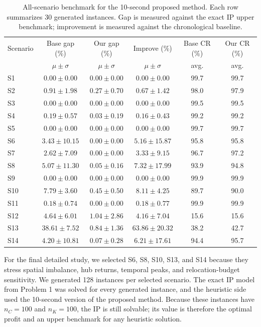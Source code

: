\documentclass[10pt,a4paper]{article}
\begin{document}
\begin{table}[ht]
\centering
\small
\setlength{\tabcolsep}{3pt}
\begin{tabular}{lccc|cc}
\toprule
Scenario & Base gap (\%) & Our gap (\%) & Improve (\%) & Base CR (\%) & Our CR (\%)\\
& $\mu \pm \sigma$ & $\mu \pm \sigma$ & $\mu \pm \sigma$ & avg. & avg.\\
\midrule
S1  & $0.00 \pm 0.00$ & $0.00 \pm 0.00$ & $0.00 \pm 0.00$ & 99.7 & 99.7\\
S2  & $0.91 \pm 1.98$ & $0.27 \pm 0.70$ & $0.67 \pm 1.42$ & 98.0 & 97.9\\
S3  & $0.00 \pm 0.00$ & $0.00 \pm 0.00$ & $0.00 \pm 0.00$ & 99.5 & 99.5\\
S4  & $0.19 \pm 0.57$ & $0.03 \pm 0.19$ & $0.16 \pm 0.43$ & 99.2 & 99.2\\
S5  & $0.00 \pm 0.00$ & $0.00 \pm 0.00$ & $0.00 \pm 0.00$ & 99.7 & 99.7\\
S6  & $3.43 \pm 10.15$ & $0.00 \pm 0.00$ & $5.16 \pm 15.87$ & 95.8 & 95.8\\
S7  & $2.62 \pm 7.09$ & $0.00 \pm 0.00$ & $3.33 \pm 9.15$ & 96.7 & 97.2\\
S8  & $5.07 \pm 11.30$ & $0.05 \pm 0.16$ & $7.32 \pm 17.99$ & 93.9 & 94.8\\
S9  & $0.00 \pm 0.00$ & $0.00 \pm 0.00$ & $0.00 \pm 0.00$ & 99.9 & 99.9\\
S10 & $7.79 \pm 3.60$ & $0.45 \pm 0.50$ & $8.11 \pm 4.25$ & 89.7 & 90.0\\
S11 & $0.18 \pm 0.74$ & $0.00 \pm 0.00$ & $0.18 \pm 0.77$ & 99.9 & 99.9\\
S12 & $4.64 \pm 6.01$ & $1.04 \pm 2.86$ & $4.16 \pm 7.04$ & 15.6 & 15.6\\
S13 & $38.61 \pm 7.52$ & $0.84 \pm 1.36$ & $63.86 \pm 20.32$ & 38.2 & 42.7\\
S14 & $4.20 \pm 10.81$ & $0.07 \pm 0.28$ & $6.21 \pm 17.61$ & 94.4 & 95.7\\
\bottomrule
\end{tabular}
\caption{All-scenario benchmark for the 10-second proposed method.  Each row
summarizes 30 generated instances.  Gap is measured against the exact IP upper
benchmark; improvement is measured against the chronological baseline.}
\end{table}

For the final detailed study, we selected S6, S8, S10, S13, and S14 because they
stress spatial imbalance, hub returns, temporal peaks, and relocation-budget
sensitivity.  We generated 128 instances per selected scenario.  The exact IP
model from Problem 1 was solved for every generated instance, and the heuristic
side used the 10-second version of the proposed method.  Because these instances
have $n_C=100$ and $n_K=100$, the IP is still solvable; its value is therefore
the optimal profit and an upper benchmark for any heuristic solution.
\end{document}

